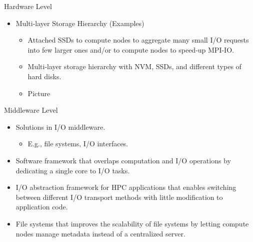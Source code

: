 \documentclass[compress,11pt,xcolor=svgnames,aspectratio=169]{beamer}
\begin{document}
\begin{frame}[t]{Hardware Level}

\begin{itemize}

      \item Multi-layer Storage Hierarchy (Examples)\\[0.4cm]

        \begin{itemize}
        \setlength\itemsep{0.6cm}

        \item Attached SSDs to compute nodes to aggregate many small I/O requests into few larger ones and/or to compute nodes to speed-up MPI-IO.

        \item Multi-layer storage hierarchy with NVM, SSDs, and different types of hard disks. %

        \item Picture

        \end{itemize}

\end{itemize}

\end{frame}

\begin{frame}[t]{Middleware Level}

\begin{itemize}
\setlength\itemsep{0.4cm}

\item Solutions in I/O middleware.

    \begin{itemize}

    \item E.g., file systems, I/O interfaces.

    \end{itemize}

\item Software framework that overlaps computation and I/O operations by dedicating a single core to I/O tasks.

\item I/O abstraction framework for HPC applications that enables switching between different I/O transport methods with little modification to application code.

\item File systems that improves the scalability of file systems by letting compute nodes manage metadata instead of a centralized server.

\end{itemize}

\end{frame}
\end{document}
